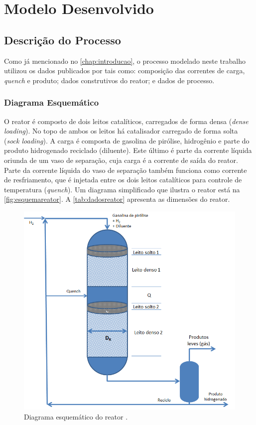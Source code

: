 %
\chapter{Modelo Desenvolvido}
\label{chap:moddesenvolvidos}

\section{Descrição do Processo} \label{sec:descricaoprocesso}

Como já mencionado no \autoref{chap:introducao}, o processo modelado
neste trabalho utilizou os dados publicados por  tais
como: composição das correntes de carga, \emph{quench} e produto; dados
construtivos do reator; e dados de processo.

\subsection{Diagrama Esquemático} \label{sec:diagramaesquematico}

O reator é composto de dois leitos catalíticos, carregados de forma
densa (\emph{dense loading}). No topo de ambos os leitos há catalisador carregado de
forma solta (\emph{sock loading}). A carga é composta de gasolina de pirólise,
hidrogênio e parte do produto hidrogenado reciclado (diluente). Este último é
parte da corrente líquida oriunda de um vaso de separação, cuja carga é a corrente de
saída do reator. Parte da corrente líquida do vaso de separação também funciona
como corrente de resfriamento, que é injetada entre os dois leitos catalíticos
para controle de temperatura (\emph{quench}). Um diagrama simplificado que
ilustra o reator está na \autoref{fig:esquemareator}. A
\autoref{tab:dadosreator} apresenta as dimensões do reator.

\begin{figure}[htb]
\centering \includegraphics[scale=0.75]{images/Chap3/esquemareatorb.png}
\caption{Diagrama esquemático do reator \cite{Rojas2014a}.}
\label{fig:esquemareator}
\end{figure}

